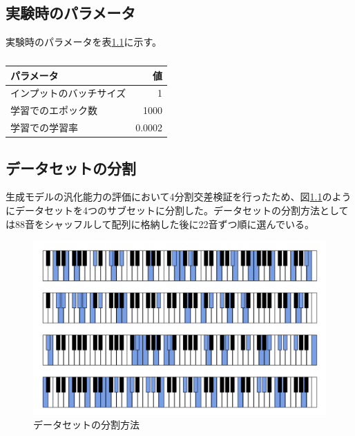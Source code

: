 \appendix
\chapter{}
\label{sec:appendix}

\section{実験時のパラメータ}
\label{sec:appendix_params}

実験時のパラメータを表\ref{tab:params}に示す。

\begin{table}[h]
\label{tab:params}
\caption{}
\begin{center}
    \begin{tabular}{lr}\toprule
        パラメータ & 値 \\ \midrule
        インプットのバッチサイズ & 1 \\ 
        学習でのエポック数 & 1000 \\ 
        学習での学習率 & 0.0002 \\ \bottomrule
    \end{tabular}
\end{center}
\end{table}

\section{データセットの分割}
\label{sec:appendix_split}

生成モデルの汎化能力の評価において4分割交差検証を行ったため、図\ref{fig:data_div}のようにデータセットを4つのサブセットに分割した。データセットの分割方法としては88音をシャッフルして配列に格納した後に22音ずつ順に選んでいる。

\begin{figure}[t]
\begin{center}
\includegraphics[width=\hsize]{figure/data_div.png}
\caption{データセットの分割方法}
\label{fig:data_div}
\end{center}
\end{figure}

